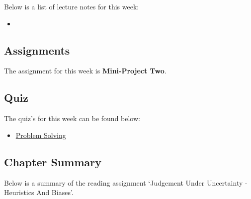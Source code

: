 \noindent Below is a list of lecture notes for this week:

\begin{itemize}
    \item {}
\end{itemize}

\subsection{Assignments}

The assignment for this week is \textbf{Mini-Project Two}.  

\subsection{Quiz}

The quiz's for this week can be found below:

\begin{itemize}
    \item \href{https://applied.cs.colorado.edu/mod/quiz/view.php?id=49364}{Problem Solving}  
\end{itemize}

\subsection{Chapter Summary}

Below is a summary of the reading assignment `Judgement Under Uncertainty - Heuristics And Biases'.

